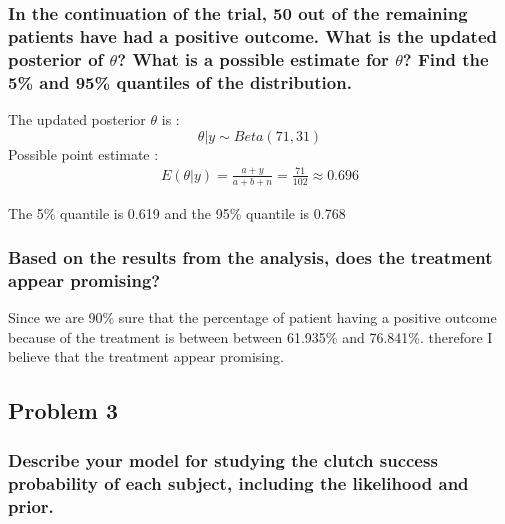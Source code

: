\documentclass[
]{article}
\begin{document}
\hypertarget{in-the-continuation-of-the-trial-50-out-of-the-remaining-patients-have-had-a-positive-outcome.-what-is-the-updated-posterior-of-theta-what-is-a-possible-estimate-for-theta-find-the-5-and-95-quantiles-of-the-distribution.}{%
\subsubsection{\texorpdfstring{In the continuation of the trial, 50 out
of the remaining patients have had a positive outcome. What is the
updated posterior of \(\theta\)? What is a possible estimate for
\(\theta\)? Find the 5\% and 95\% quantiles of the
distribution.}{In the continuation of the trial, 50 out of the remaining patients have had a positive outcome. What is the updated posterior of \textbackslash theta? What is a possible estimate for \textbackslash theta? Find the 5\% and 95\% quantiles of the distribution.}}\label{in-the-continuation-of-the-trial-50-out-of-the-remaining-patients-have-had-a-positive-outcome.-what-is-the-updated-posterior-of-theta-what-is-a-possible-estimate-for-theta-find-the-5-and-95-quantiles-of-the-distribution.}}

The updated posterior \(\theta\) is : \[\theta|y \sim Beta(71, 31)\]
Possible point estimate : \begin{align}
  E(\theta|y) = \frac{a+y}{a+b+n} 
  = \frac{71}{102}
  \approx 0.696
\end{align}

The 5\% quantile is 0.619 and the 95\% quantile is 0.768

\hypertarget{based-on-the-results-from-the-analysis-does-the-treatment-appear-promising}{%
\subsubsection{Based on the results from the analysis, does the
treatment appear
promising?}\label{based-on-the-results-from-the-analysis-does-the-treatment-appear-promising}}

Since we are 90\% sure that the percentage of patient having a positive
outcome because of the treatment is between between 61.935\% and
76.841\%. therefore I believe that the treatment appear promising.

\hypertarget{problem-3}{%
\subsection{Problem 3}\label{problem-3}}

\hypertarget{describe-your-model-for-studying-the-clutch-success-probability-of-each-subject-including-the-likelihood-and-prior.}{%
\subsubsection{Describe your model for studying the clutch success
probability of each subject, including the likelihood and
prior.}\label{describe-your-model-for-studying-the-clutch-success-probability-of-each-subject-including-the-likelihood-and-prior.}}
\end{document}
